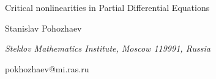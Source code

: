 \documentclass[10pt,a4paper]{article}
\begin{document}
\begin{center}

{\Large Critical nonlinearities in Partial Differential Equations}

\bigskip

{\sc Stanislav Pohozhaev}

{\small\it Steklov Mathematics Institute, Moscow 119991, Russia}

{\small\rm pokhozhaev@mi.ras.ru}

\end{center}

\bigskip
\end{document}
